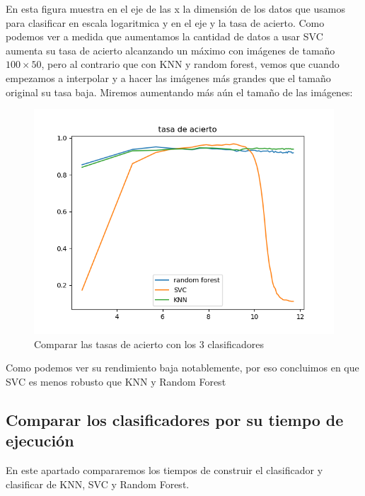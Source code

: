 \documentclass[8pt,a4paper]{article}
\begin{document}
En esta figura muestra en el eje de las x la dimensión de los datos que usamos para clasificar en escala logaritmica y en el eje y la tasa de acierto.
Como podemos ver a medida que aumentamos la cantidad de datos a usar SVC aumenta su tasa de acierto alcanzando un máximo con imágenes de tamaño $100\times50$, pero al contrario que con KNN y random forest, vemos que cuando empezamos a interpolar y a hacer las imágenes más grandes que el tamaño original su tasa baja.
Miremos aumentando más aún el tamaño de las imágenes:
\begin{figure}[htbp]
    \includegraphics[width=\textwidth]{./AciertosFinal.png}
    \caption{Comparar las tasas de acierto con los 3 clasificadores}
\end{figure}
Como podemos ver su rendimiento baja notablemente, por eso concluimos en que SVC es menos robusto que KNN y Random Forest

\subsection{Comparar los clasificadores por su tiempo de ejecución}

En este apartado compararemos los tiempos de construir el clasificador y clasificar de KNN, SVC y Random Forest.
\end{document}
